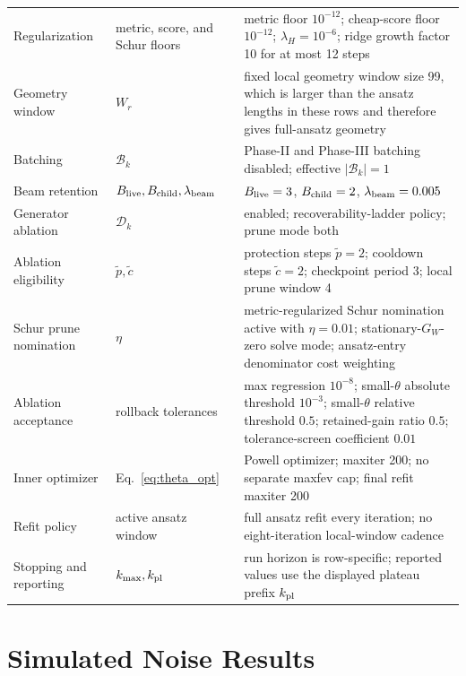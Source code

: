 \documentclass[
  reprint,
  amsmath,
  amssymb,
  aps,
  pra,
  nofootinbib,
  superscriptaddress,
  floatfix
]{revtex4-2}
\begin{document}
\begin{widetext}
{\begin{tabular}{@{}p{}p{}p{}@{}}
Regularization & metric, score, and Schur floors & metric floor \(10^{-12}\); cheap-score floor \(10^{-12}\); \(\lambda_H=10^{-6}\); ridge growth factor 10 for at most 12 steps \\
Geometry window & \(W_r\) & fixed local geometry window size 99, which is larger than the ansatz lengths in these rows and therefore gives full-ansatz geometry \\
Batching & \(\mathcal B_k\) & Phase-II and Phase-III batching disabled; effective \(|\mathcal B_k|=1\) \\
Beam retention & \(B_{\rm live},B_{\rm child},\lambda_{\rm beam}\) & \(B_{\rm live}=3\), \(B_{\rm child}=2\), \(\lambda_{\rm beam}=0.005\) \\
Generator ablation & \(\mathcal D_k\) & enabled; recoverability-ladder policy; prune mode both \\
Ablation eligibility & \(\tilde p,\tilde c\) & protection steps \(\tilde p=2\); cooldown steps \(\tilde c=2\); checkpoint period 3; local prune window 4 \\
Schur prune nomination & \(\eta\) & metric-regularized Schur nomination active with \(\eta=0.01\); stationary-\(G_W\)-zero solve mode; ansatz-entry denominator cost weighting \\
Ablation acceptance & rollback tolerances & max regression \(10^{-8}\); small-\(\theta\) absolute threshold \(10^{-3}\); small-\(\theta\) relative threshold \(0.5\); retained-gain ratio \(0.5\); tolerance-screen coefficient \(0.01\) \\
Inner optimizer & Eq.~\eqref{eq:theta_opt} & Powell optimizer; maxiter 200; no separate maxfev cap; final refit maxiter 200 \\
Refit policy & active ansatz window & full ansatz refit every iteration; no eight-iteration local-window cadence \\
Stopping and reporting & \(k_{\max},k_{\rm pl}\) & run horizon is row-specific; reported values use the displayed plateau prefix \(k_{\rm pl}\) \\
\bottomrule
\end{tabular}%
}
\end{widetext}

\section{Simulated Noise Results}
\label{app:noise_selection_robustness}
\label{app:finite_shot_score_robustness}
\end{document}
